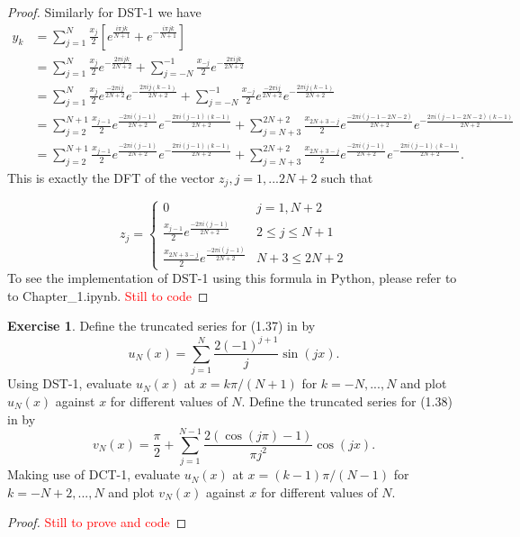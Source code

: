 \documentclass{amsart}
\theoremstyle{plain}
\theoremstyle{definition}
\newtheorem{exer}{Exercise}[section]
\newcommand{\tcr}[1]{\textcolor{red}{#1}}
\begin{document}
\begin{proof}
    Similarly for DST-1 we have 
    \begin{align*}
        y_k &= \sum_{j=1}^N \frac{x_j}{2} \left[e^{\frac{i\pi j k}{N+1}} + e^{-\frac{i\pi j k}{N+1}}\right]\\
        &= \sum_{j=1}^N\frac{x_j}{2}e^{-\frac{2\pi i j k}{2N+2}} + \sum_{j=-N}^{-1} \frac{x_{-j}}{2}e^{-\frac{2\pi i j k}{2N+2}}\\
        &= \sum_{j=1}^N\frac{x_j}{2}e^{\frac{-2\pi i j}{2N+2}}e^{-\frac{2\pi i j (k-1)}{2N+2}} + \sum_{j=-N}^{-1} \frac{x_{-j}}{2}e^{\frac{-2\pi i j}{2N+2}}e^{-\frac{2\pi i j (k-1)}{2N+2}}\\
        &= \sum_{j=2}^{N+1}\frac{x_{j-1}}{2}e^{\frac{-2\pi i (j-1)}{2N+2}}e^{-\frac{2\pi i (j-1) (k-1)}{2N+2}} + \sum_{j=N+3}^{2N+2} \frac{x_{2N+3-j}}{2}e^{\frac{-2\pi i (j-1-2N-2)}{2N+2}}e^{-\frac{2\pi i (j-1-2N-2) (k-1)}{2N+2}}\\
        &= \sum_{j=2}^{N+1}\frac{x_{j-1}}{2}e^{\frac{-2\pi i (j-1)}{2N+2}}e^{-\frac{2\pi i (j-1) (k-1)}{2N+2}} + \sum_{j=N+3}^{2N+2} \frac{x_{2N+3-j}}{2}e^{\frac{-2\pi i (j-1)}{2N+2}}e^{-\frac{2\pi i (j-1) (k-1)}{2N+2}}.
    \end{align*}
    This is exactly the DFT of the vector $z_j, j = 1,... 2N+2$ such that 

      $$  z_j = \begin{cases}
            0& j = 1, N+2\\
            \frac{x_{j-1}}{2}e^{\frac{-2\pi i (j-1)}{2N+2}} & 2 \leq j \leq N+1 \\
            \frac{x_{2N+3-j}}{2}e^{\frac{-2\pi i (j-1)}{2N+2}} & N+3 \leq 2N+2
        \end{cases}$$
    To see the implementation of DST-1 using this formula in Python, please refer to to Chapter\_1.ipynb.
    \tcr{Still to code}
\end{proof}

\begin{exer}
    Define the truncated series for (1.37) in \cite{lord2014introduction} by
$$u_N (x) = \sum_{j=1}^N \frac{2\left(-1\right)^{j+1}}{j}\sin(jx).$$
Using DST-1, evaluate $u_N(x)$ at $x = k\pi/(N +1)$ for $k =−N,...,N$ and plot $u_N(x)$
against $x$ for different values of $N$. Define the truncated series for (1.38) in \cite{lord2014introduction} by
$$v_N (x) = \frac{\pi}{2}+ \sum_{j=1}^{N-1} \frac{2\left(\cos(j\pi)-1\right)}{\pi j^2}\cos(jx).$$
Making use of DCT-1, evaluate $u_N(x)$ at $x =(k -1)\pi/(N-1)$ for $k =-N +2,...,N$
and plot $v_N (x)$ against $x$ for different values of $N$.

\end{exer}
\begin{proof}
    \tcr{Still to prove and code}
\end{proof}

\printbibliography
\end{document}
